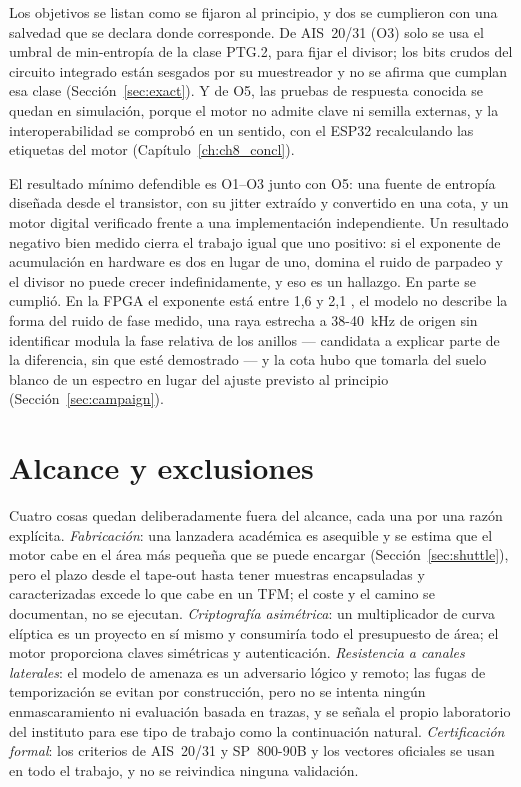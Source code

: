 Los objetivos se listan como se fijaron al principio, y dos se cumplieron
con una salvedad que se declara donde corresponde. De AIS~20/31 (O3) solo
se usa el umbral de min-entropía de la clase PTG.2, para fijar el
divisor; los bits crudos del circuito integrado están sesgados por su
muestreador y no se afirma que cumplan esa clase
(Sección~\ref{sec:exact}). Y de O5, las pruebas de respuesta conocida se
quedan en simulación, porque el motor no admite clave ni semilla
externas, y la interoperabilidad se comprobó en un sentido, con el ESP32
recalculando las etiquetas del motor (Capítulo~\ref{ch:ch8_concl}).

El resultado mínimo defendible es O1--O3 junto con O5: una fuente de
entropía diseñada desde el transistor, con su jitter extraído y convertido
en una cota, y un motor digital verificado frente a una implementación
independiente. Un resultado negativo bien medido cierra el trabajo igual
que uno positivo: si el exponente de acumulación en hardware es dos en
lugar de uno, domina el ruido de parpadeo y el divisor no puede crecer
indefinidamente, y eso es un hallazgo. En parte se cumplió. En la
FPGA el exponente está entre 1,6 y 2,1 \meas{}, el modelo no describe
la forma del ruido de fase medido, una raya estrecha a 38-40~kHz de
origen sin identificar modula la fase relativa de los anillos ---
candidata a explicar parte de la diferencia, sin que esté demostrado ---
y la cota hubo que tomarla
del suelo blanco de un espectro en lugar del ajuste previsto al principio
(Sección~\ref{sec:campaign}).

\section{Alcance y exclusiones}
\label{sec:scope}

Cuatro cosas quedan deliberadamente fuera del alcance, cada una por una
razón explícita. \emph{Fabricación}: una lanzadera académica es asequible
y se estima que el motor cabe en el área más pequeña que se puede
encargar \est{} (Sección~\ref{sec:shuttle}),
pero el plazo
desde el tape-out hasta tener muestras encapsuladas y caracterizadas
excede lo que cabe en un TFM; el coste y el camino se documentan, no se
ejecutan. \emph{Criptografía asimétrica}: un multiplicador de curva
elíptica es un proyecto en sí mismo y consumiría todo el presupuesto de
área; el motor proporciona claves simétricas y autenticación.
\emph{Resistencia a canales laterales}: el modelo de amenaza es un
adversario lógico y remoto; las fugas de temporización se evitan por
construcción, pero no se intenta ningún enmascaramiento ni evaluación
basada en trazas, y se señala el propio laboratorio del instituto para
ese tipo de trabajo como la continuación natural. \emph{Certificación
formal}: los criterios de AIS~20/31 y SP~800-90B y los vectores oficiales
se usan en todo el trabajo, y no se reivindica ninguna validación.

